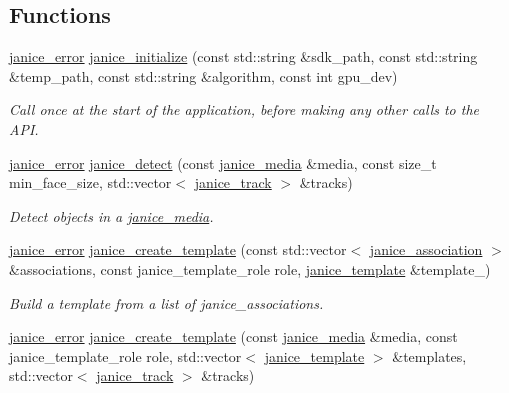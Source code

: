 \subsection*{Functions}
\begin{DoxyCompactItemize}
\item 
\hyperlink{group__janice_ga4873d49c1f9d6a6880dfbd485cf6ba72}{janice\+\_\+error} \hyperlink{group__janice_gaaf573a6dd7b46fccb2cbc61fb45f34ff}{janice\+\_\+initialize} (const std\+::string \&sdk\+\_\+path, const std\+::string \&temp\+\_\+path, const std\+::string \&algorithm, const int gpu\+\_\+dev)
\begin{DoxyCompactList}\small\item\em Call once at the start of the application, before making any other calls to the A\+P\+I. \end{DoxyCompactList}\item 
\hyperlink{group__janice_ga4873d49c1f9d6a6880dfbd485cf6ba72}{janice\+\_\+error} \hyperlink{group__janice_gafa4e88d39c9279d985b2e8f8d21e17dc}{janice\+\_\+detect} (const \hyperlink{structjanice__media}{janice\+\_\+media} \&media, const size\+\_\+t min\+\_\+face\+\_\+size, std\+::vector$<$ \hyperlink{structjanice__track}{janice\+\_\+track} $>$ \&tracks)
\begin{DoxyCompactList}\small\item\em Detect objects in a \hyperlink{structjanice__media}{janice\+\_\+media}. \end{DoxyCompactList}\item 
\hyperlink{group__janice_ga4873d49c1f9d6a6880dfbd485cf6ba72}{janice\+\_\+error} \hyperlink{group__janice_gaeced30a29d7d708883464dc7f9eba990}{janice\+\_\+create\+\_\+template} (const std\+::vector$<$ \hyperlink{structjanice__association}{janice\+\_\+association} $>$ \&associations, const janice\+\_\+template\+\_\+role role, \hyperlink{group__janice_ga5593b06e86b90504968c0fc191ee2f3c}{janice\+\_\+template} \&template\+\_\+)
\begin{DoxyCompactList}\small\item\em Build a template from a list of janice\+\_\+associations. \end{DoxyCompactList}\item 
\hyperlink{group__janice_ga4873d49c1f9d6a6880dfbd485cf6ba72}{janice\+\_\+error} \hyperlink{group__janice_ga5e4cfef028421dfa919c59574e1b2b83}{janice\+\_\+create\+\_\+template} (const \hyperlink{structjanice__media}{janice\+\_\+media} \&media, const janice\+\_\+template\+\_\+role role, std\+::vector$<$ \hyperlink{group__janice_ga5593b06e86b90504968c0fc191ee2f3c}{janice\+\_\+template} $>$ \&templates, std\+::vector$<$ \hyperlink{structjanice__track}{janice\+\_\+track} $>$ \&tracks)

\end{DoxyCompactItemize}
